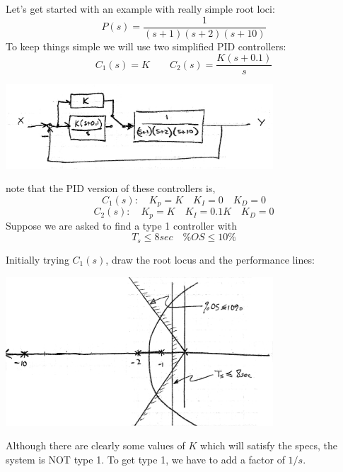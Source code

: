 \begin{Example}
Let's get started with an example with really simple root loci:
\[
P(s) = \frac  {1}   {(s+1)(s+2)(s+10)}
\]
To keep things simple we will use two simplified PID controllers:   
\[
C_1(s) = K \qquad   C_2(s) = \frac   {K(s+0.1)} {s} 
\]

\includegraphics[width=100mm]{figs09/01107.png}

note that the PID version of these controllers is, 
\[
C_1(s):  \quad K_p = K \quad K_I = 0 \quad K_D = 0
\]
\[
C_2(s):  \quad K_p = K \quad K_I = 0.1K \quad K_D = 0
\]
Suppose we are asked  to find a type 1 controller with 
\[
T_s \leq 8sec \quad \%OS \leq 10\%
\]

Initially trying $C_1(s)$, draw the root locus and the performance lines:

\includegraphics[width=100mm]{figs09/01108.png}

Although   there are clearly some values of $K$ which will satisfy the specs, the system is NOT type 1. 
To get type 1, we have to add a factor of $1/s$.  
\end{Example}
